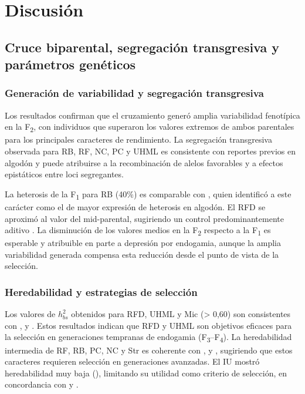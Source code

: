 \documentclass[12pt,oneside]{reedthesis}
\begin{document}
\section{Discusión}\label{discusiuxf3n-1}

\subsection{Cruce biparental, segregación transgresiva y parámetros genéticos}\label{cruce-biparental-segregaciuxf3n-transgresiva-y-paruxe1metros-genuxe9ticos}

\subsubsection{Generación de variabilidad y segregación transgresiva}\label{generaciuxf3n-de-variabilidad-y-segregaciuxf3n-transgresiva}

Los resultados confirman que el cruzamiento generó amplia variabilidad fenotípica en la F\textsubscript{2}, con individuos que superaron los valores extremos de ambos parentales para los principales caracteres de rendimiento. La segregación transgresiva observada para RB, RF, NC, PC y UHML es consistente con reportes previos en algodón \autocite{khan2005,nidagundi2023} y puede atribuirse a la recombinación de alelos favorables y a efectos epistáticos entre loci segregantes.

La heterosis de la F\textsubscript{1} para RB (40\%) es comparable con \textcite{meredith1984}, quien identificó a este carácter como el de mayor expresión de heterosis en algodón. El RFD se aproximó al valor del mid-parental, sugiriendo un control predominantemente aditivo \autocite{mccarty2003}. La disminución de los valores medios en la F\textsubscript{2} respecto a la F\textsubscript{1} es esperable y atribuible en parte a depresión por endogamia, aunque la amplia variabilidad generada compensa esta reducción desde el punto de vista de la selección.

\subsubsection{Heredabilidad y estrategias de selección}\label{heredabilidad-y-estrategias-de-selecciuxf3n}

Los valores de \(h_{bs}^{2}\) obtenidos para RFD, UHML y Mic (\textgreater{} 0,60) son consistentes con \textcite{meredith1984}, \textcite{ribeiro2017} y \textcite{decarvalho2022}. Estos resultados indican que RFD y UHML son objetivos eficaces para la selección en generaciones tempranas de endogamia (F\textsubscript{3}--F\textsubscript{4}). La heredabilidad intermedia de RF, RB, PC, NC y Str es coherente con \textcite{tang1996}, \textcite{nidagundi2023} y \textcite{peixoto2021} , sugiriendo que estos caracteres requieren selección en generaciones avanzadas. El IU mostró heredabilidad muy baja (), limitando su utilidad como criterio de selección, en concordancia con \textcite{meredithjr2003} y \textcite{smith2010} .
\end{document}

